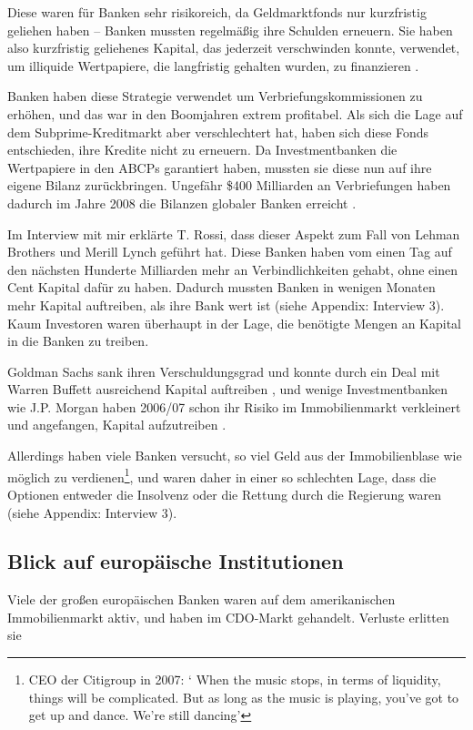 \documentclass[a4paper,11pt]{report}
\begin{document}
Diese waren f\"ur Banken sehr risikoreich,
da Geldmarktfonds nur kurzfristig
geliehen haben -- Banken mussten regelm\"aßig ihre Schulden erneuern.
Sie haben also kurzfristig geliehenes Kapital, das jederzeit verschwinden
konnte, verwendet, um illiquide Wertpapiere, die langfristig gehalten wurden,
zu finanzieren \parencite[201]{acharyar}.

Banken haben diese Strategie verwendet um Verbriefungskommissionen
zu erh\"ohen, und das war in den Boomjahren extrem profitabel.
Als sich die Lage auf dem Subprime-Kreditmarkt aber verschlechtert hat,
haben sich diese Fonds entschieden, ihre Kredite nicht zu erneuern.
Da Investmentbanken die Wertpapiere in den ABCPs garantiert haben, mussten
sie diese nun auf ihre eigene Bilanz zur\"uckbringen. Ungef\"ahr \$400 Milliarden
an Verbriefungen haben dadurch im Jahre 2008 die Bilanzen globaler Banken
erreicht \parencite[570]{crottycam}.

Im Interview mit mir erkl\"arte T. Rossi, dass dieser Aspekt
zum Fall von Lehman Brothers und Merill Lynch gef\"uhrt hat.
Diese Banken haben vom einen Tag auf den n\"achsten Hunderte
Milliarden mehr an Verbindlichkeiten gehabt, ohne einen Cent
Kapital daf\"ur zu haben.
Dadurch mussten Banken in wenigen Monaten
mehr Kapital auftreiben, als ihre Bank wert ist (siehe Appendix: Interview 3).
Kaum Investoren waren \"uberhaupt in der Lage,
die ben\"otigte Mengen an Kapital in die Banken zu treiben.

Goldman Sachs sank ihren Verschuldungsgrad und konnte
durch ein Deal mit Warren Buffett 
ausreichend Kapital auftreiben \parencite{buffettyt}, und wenige Investmentbanken wie 
J.P. Morgan haben 2006/07 schon ihr Risiko im Immobilienmarkt
verkleinert und angefangen, Kapital aufzutreiben \parencite{dimonyt}.

Allerdings haben viele Banken versucht, so viel Geld aus
der Immobilienblase wie m\"oglich zu verdienen\footnote{
  CEO der Citigroup in 2007: \foreignquote*{english}{
    When the music stops, in terms of liquidity, things will be complicated.
    But as long as the music is playing, you've got to get up and dance.
    We're still dancing}
}, und waren daher in einer so schlechten Lage,
dass die Optionen entweder die Insolvenz oder die Rettung
durch die Regierung waren (siehe Appendix: Interview 3).

\subsection{Blick auf europ\"aische Institutionen}
Viele der großen europäischen Banken waren auf dem amerikanischen
Immobilienmarkt aktiv, und haben im CDO-Markt gehandelt.
Verluste erlitten sie 
\end{document}
